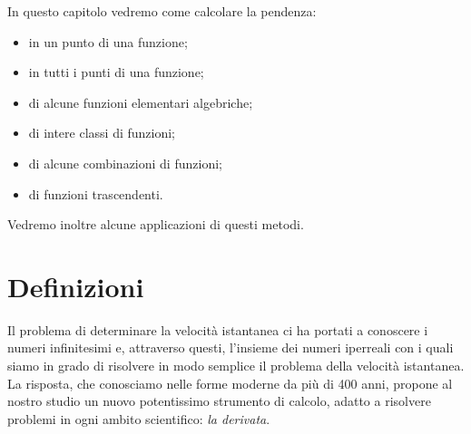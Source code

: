 % 
% 

In questo capitolo vedremo come calcolare la pendenza:
\begin{itemize} [nosep]
\item in un punto di una funzione;
\item in tutti i punti di una funzione;
\item di alcune funzioni elementari algebriche;
\item di intere classi di funzioni;
\item di alcune combinazioni di funzioni;
\item di funzioni trascendenti.
\end{itemize}
Vedremo inoltre alcune applicazioni di questi metodi.


\section{Definizioni}
\label{sec:differenziazione_definizioni}
Il problema di determinare la velocità istantanea ci ha portati a conoscere 
i numeri infinitesimi e, attraverso questi, l'insieme dei numeri iperreali 
con i quali siamo in grado di risolvere in modo semplice il problema della 
velocità istantanea.
La risposta, che conosciamo nelle forme moderne da più di 400 anni,
propone al nostro studio un nuovo potentissimo strumento di calcolo, 
adatto a risolvere problemi in ogni ambito scientifico: \emph{la derivata}.

